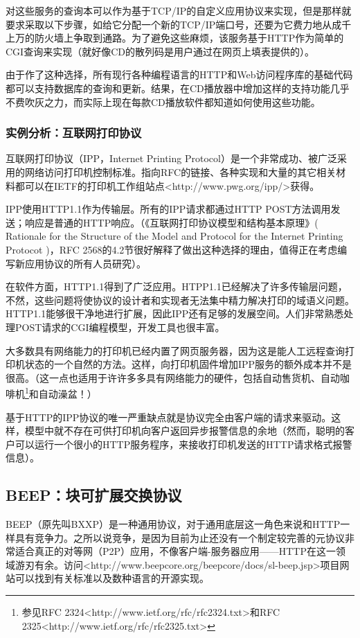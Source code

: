 \documentclass[12pt,oneside]{book}
\begin{document}
\begin{common-format}
对这些服务的查询本可以作为基于TCP/IP的自定义应用协议来实现，但是那样就要求采取以下步骤，如给它分配一个新的TCP/IP端口号，还要为它费力地从成千上万的防火墙上争取到通路。为了避免这些麻烦，该服务基于HTTP作为简单的CGI查询来实现（就好像CD的散列码是用户通过在网页上填表提供的）。

由于作了这种选择，所有现行各种编程语言的HTTP和Web访问程序库的基础代码都可以支持数据库的查询和更新。结果，在CD播放器中增加这样的支持功能几乎不费吹灰之力，而实际上现在每款CD播放软件都知道如何使用这些功能。

\subsubsection{实例分析：互联网打印协议}
互联网打印协议（IPP，Internet Printing Protocol）是一个非常成功、被广泛采用的网络访问打印机控制标准。指向RFC的链接、各种实现和大量的其它相关材料都可以在IETF的打印机工作组站点<http://www.pwg.org/ipp/>获得。

IPP使用HTTP1.1作为传输层。所有的IPP请求都通过HTTP POST方法调用发送；响应是普通的HTTP响应。（《互联网打印协议模型和结构基本原理》( Rationale for the Structure of the Model and Protocol for the Internet Printing Protocot )，RFC 2568的4.2节很好解释了做出这种选择的理由，值得正在考虑编写新应用协议的所有人员研究）。

在软件方面，HTTP1.1得到了广泛应用。HTPP1.1已经解决了许多传输层问题，不然，这些问题将使协议的设计者和实现者无法集中精力解决打印的域语义问题。HTTP1.1能够很干净地进行扩展，因此IPP还有足够的发展空间。人们非常熟悉处理POST请求的CGI编程模型，开发工具也很丰富。

大多数具有网络能力的打印机已经内置了网页服务器，因为这是能人工远程查询打印机状态的一个自然的方法。这样，向打印机固件增加IPP服务的额外成本并不是很高。（这一点也适用于许许多多具有网络能力的硬件，包括自动售货机、自动咖啡机\footnote{参见RFC 2324<http://www.ietf.org/rfc/rfc2324.txt>和RFC 2325<http://www.ietf.org/rfc/rfc2325.txt>}和自动澡盆！）

基于HTTP的IPP协议的唯一严重缺点就是协议完全由客户端的请求来驱动。这样，模型中就不存在可供打印机向客户返回异步报警信息的余地（然而，聪明的客户可以运行一个很小的HTTP服务程序，来接收打印机发送的HTTP请求格式报警信息）。

\subsection{BEEP：块可扩展交换协议}
BEEP（原先叫BXXP）是一种通用协议，对于通用底层这一角色来说和HTTP一样具有竞争力。之所以说竞争，是因为目前为止还没有一个制定较完善的元协议非常适合真正的对等网（P2P）应用，不像客户端-服务器应用——HTTP在这一领域游刃有余。访问<http://www.beepcore.org/beepcore/docs/sl-beep.jsp>项目网站可以找到有关标准以及数种语言的开源实现。
 

\end{common-format}
\end{document}

